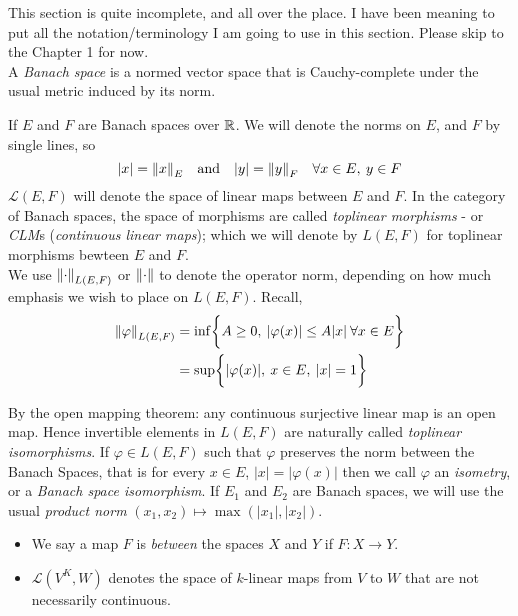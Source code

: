 \documentclass[../main-manifolds.tex]{subfiles}
\begin{document}
\newpage
{}
This section is quite incomplete, and all over the place. I have been meaning to put all the notation/terminology I am going to use in this section. Please skip to the Chapter 1 for now.\\

%
A \emph{Banach space} is a normed vector space that is Cauchy-complete under the usual metric induced by its norm. 

If $E$ and $F$ are Banach spaces over $\mathbb{R}$. We will denote the norms on $E$, and $F$ by single lines, so 
\[
    \vert x\vert = \norm{x}_E\qqtext{and} \vert y\vert = \norm{y}_F\quad\forall x\in E,\: y\in F
\]
$\mathcal{L}(E,F)$ will denote the space of linear maps between $E$ and $F$. In the category of Banach spaces, the space of morphisms are called \emph{toplinear morphisms} - or \emph{CLM}s (\emph{continuous linear maps}); which we will denote by $L(E,F)$ for toplinear morphisms bewteen $E$ and $F$. \\


We use $\norm{\cdot}_{L(E,F)}$ or $\norm{\cdot}$ to denote the operator norm, depending on how much emphasis we wish to place on $L(E,F)$. Recall,
\begin{align*}
\norm{\varphi}_{L(E,F)} &= \inf\biggl\{{A\geq 0,\: \vert\varphi(x)\vert\leq A\vert x\vert\:\forall x\in E}\biggr\}\\
&= \sup\biggl\{{\vert\varphi(x)\vert,\: x\in E,\: \vert x\vert=1}\biggr\}
\end{align*}


By the open mapping theorem: any continuous surjective linear map is an open map. Hence invertible elements in $L(E,F)$ are naturally called \emph{toplinear isomorphisms}. If $\varphi\in L(E,F)$ such that $\varphi$ preserves the norm between the Banach Spaces, that is for every $x\in E$, $\vert x\vert = \vert \varphi(x)\vert$ then we call $\varphi$ an \emph{isometry}, or a \emph{Banach space isomorphism}. If $E_1$ and $E_2$ are Banach spaces, we will use the usual \emph{product norm} $(x_1, x_2)\mapsto \max(\vert x_1\vert,\vert x_2\vert)$. 

\begin{itemize}
    \item We say a map $F$ is \emph{between} the spaces $X$ and $Y$ if $F: X\to Y$. 
    \item $\mathcal{L}(V^K,W)$ denotes the space of $k$-linear maps from $V$ to $W$ that are not necessarily continuous. 
\end{itemize}
\end{document}
